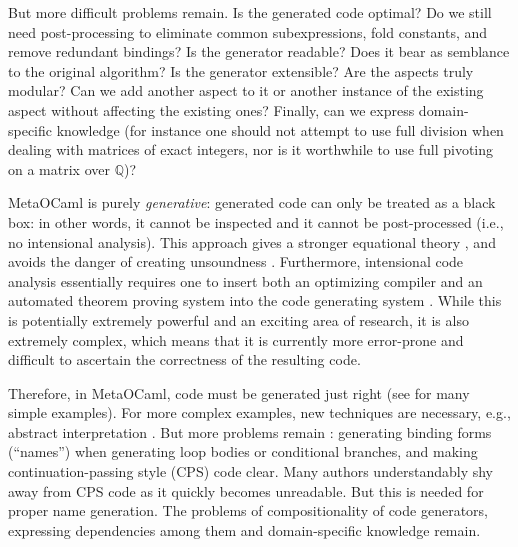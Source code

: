 \documentclass[draft]{elsart}
\begin{document}
But more difficult problems remain. Is the generated code optimal? Do
we still need post-processing to eliminate common subexpressions,
fold constants, and remove redundant bindings? Is the generator readable?
Does it bear as semblance to the original algorithm? Is the generator
extensible? Are the aspects truly modular? Can we add another aspect to it or
another instance of the existing aspect without affecting the existing ones?
Finally, can we express domain-specific knowledge (for instance one should not
attempt to use full division when dealing with matrices of exact integers, nor
is it worthwhile to use full pivoting on a matrix over $\mathbb Q$)?

MetaOCaml is purely \emph{generative}: generated code can only be treated as
a black box: in other words, it cannot be inspected and it cannot be
post-processed (i.e., no intensional analysis). This approach gives a stronger
equational theory \cite{Taha2000}, and avoids the danger of creating
unsoundness \cite{TahaThesis}. Furthermore, intensional code analysis
essentially requires one to insert both an optimizing compiler and an
automated theorem proving system into the code generating system
\cite{Pueschel:05,Kennedy01Telescoping,dongarra7,Veldhuizen:2004}.
While this is potentially extremely powerful and an exciting area of
research, it is also extremely complex, which means that it is
currently more error-prone and difficult to ascertain the correctness
of the resulting code.

Therefore, in MetaOCaml, code must be generated just right (see
\cite{TahaThesis} for many simple examples).  For more complex
examples, new techniques are necessary, e.g., abstract interpretation
\cite{KiselyovTaha}.  But more problems remain
\cite{Padua:MetaOcaml:04}: generating binding forms (``names'')
when generating loop bodies or conditional branches, and making
continuation-passing style (CPS) code clear.  Many authors
understandably shy away from CPS code as it quickly becomes
unreadable.  But this is needed for proper name generation.
The problems of compositionality of code generators, expressing
dependencies among them and domain-specific knowledge remain.
\end{document}

